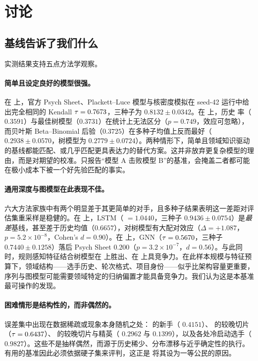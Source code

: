 \section{讨论}
\label{sec:discussion}

\subsection{基线告诉了我们什么}
\label{sec:disc-insights}

实测结果支持五点方法学观察。

\paragraph{简单且设定良好的模型很强。}在  上，官方 Psych Sheet、Plackett--Luce 模型与核密度模拟在 seed-42 运行中给出完全相同的 Kendall $\tau=0.7673$，三种子为 $0.8132\pm0.0342$。在  上，历史 \DNF{} 率（$0.3591$）与最佳树模型（$0.3731$）在统计上无法区分（$p=0.749$，效应可忽略），而贝叶斯 Beta--Binomial 后验（$0.3725$）在多种子均值上反而最好（$0.2938\pm0.0570$，树模型为 $0.2779\pm0.0724$）。两种情形下，简单且领域知识驱动的基线都能匹配、或几乎匹配更具表达力的替代方案。这并非放弃更复杂模型的理由，而是对期望的校准。只报告“模型 A 击败模型 B”的基准，会掩盖二者都可能在极小成本下被一个好先验匹配的事实。

\paragraph{通用深度与图模型在此表现不佳。}六大方法家族中有两个明显差于其更简单的对手，且多种子结果表明这一差距对评估集重采样是稳健的。在  上，LSTM（\maelog{} $=1.0440$，三种子 $0.9436\pm0.0754$）是\emph{最差}基线，甚至差于历史均值（$0.6657$），对树模型有大配对效应（$\Delta=+1.087$，$p=5.2\times10^{-8}$，Cohen's $d=0.90$）。在  上，GNN（$\tau=0.5670$，三种子 $0.7440\pm0.1258$）落后 Psych Sheet $0.200$（$p=3.2\times10^{-7}$，$d=0.56$）。与此同时，规则感知特征结合树模型在  上胜出、在  上具竞争力。在此样本规模与特征预算下，领域结构——选手历史、轮次格式、项目身份——似乎比架构容量更重要，序列与图模型可能需要领域特定的归纳偏置才能具备竞争力。我们认为这是本基准最可操作的发现。

\paragraph{困难情形是结构性的，而非偶然的。}误差集中出现在数据稀疏或现象本身随机之处： 的新手（\maelog{} $0.4151$）、 的较晚切片（$\tau=0.6437$）、 的较晚切片与精英（\aucpr{} $0.2962$ 与 $0.1399$），以及各处冷启动选手（\maelog{} $0.9827$）。这些不是抽样偶然，而源于历史稀少、分布漂移与近乎确定性的执行。有用的基准因此必须依据硬子集来评判，这正是 \wcabench{} 将其设为一等公民的原因。

